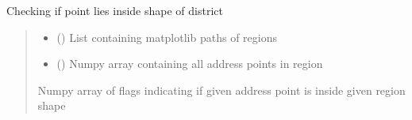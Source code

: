 \documentclass[letterpaper,10pt,english]{sphinxmanual}
\begin{document}
\begin{fulllineitems}
\label{\detokenize{geo_utilities:geo_utilities.points_in_shape}}
\pysigstartsignatures
{}
\pysigstopsignatures
\sphinxAtStartPar
Checking if point lies inside shape of district
\begin{quote}\begin{description}
\begin{itemize}
\item {} 
\sphinxAtStartPar
{} (\sphinxcode{\sphinxupquote{List}}{[}\sphinxcode{\sphinxupquote{Path}}{]}) \textendash{} List containing matplotlib paths of regions

\item {} 
\sphinxAtStartPar
{} () \textendash{} Numpy array containing all address points in region

\end{itemize}

\sphinxAtStartPar
{}

\sphinxAtStartPar
Numpy array of flags indicating if given address point is inside given region shape

\end{description}\end{quote}

\end{fulllineitems}

\end{document}
